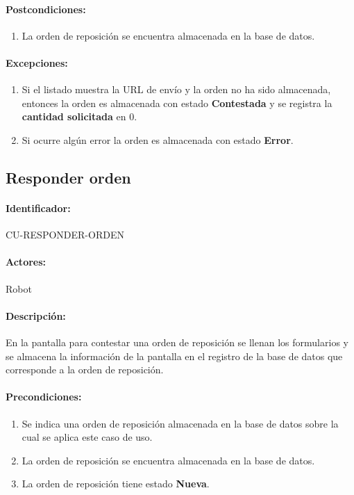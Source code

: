 \paragraph{Postcondiciones:}
\begin{enumerate}
  \item La orden de reposición se encuentra almacenada en la base de datos.
\end{enumerate}
\paragraph{Excepciones:}
\begin{enumerate}
  \item Si el listado muestra la URL de envío y la orden no ha sido almacenada, entonces la orden es almacenada con estado \textbf{Contestada} y se registra la \textbf{cantidad solicitada} en 0.
  \item Si ocurre algún error la orden es almacenada con estado \textbf{Error}.
\end{enumerate}


\subsection{Responder orden}\label{cu-responder-orden}
\paragraph{Identificador:}\label{cu-responder-orden}
CU-RESPONDER-ORDEN
\paragraph{Actores:}
Robot
\paragraph{Descripción:}
En la pantalla para contestar una orden de reposición se llenan los formularios y se almacena la información de la pantalla en el registro de la base de datos que corresponde a la orden de reposición.
\paragraph{Precondiciones:}
\begin{enumerate}
  \item Se indica una orden de reposición almacenada en la base de datos sobre la cual se aplica este caso de uso.
  \item La orden de reposición se encuentra almacenada en la base de datos.
  \item La orden de reposición tiene estado \textbf{Nueva}.
\end{enumerate}
